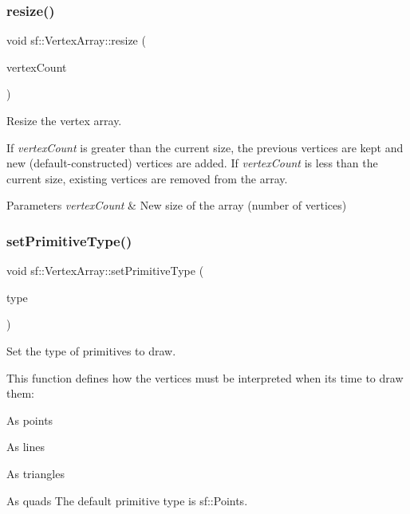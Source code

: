 \subsubsection{\texorpdfstring{resize()}{resize()}}
{\footnotesize\ttfamily void sf\+::\+Vertex\+Array\+::resize (\begin{DoxyParamCaption}\item[{std\+::size\+\_\+t}]{vertex\+Count }\end{DoxyParamCaption})}



Resize the vertex array. 

If {\itshape vertex\+Count} is greater than the current size, the previous vertices are kept and new (default-\/constructed) vertices are added. If {\itshape vertex\+Count} is less than the current size, existing vertices are removed from the array.


\begin{DoxyParams}{Parameters}
{\em vertex\+Count} & New size of the array (number of vertices) \\
\hline
\end{DoxyParams}
\mbox{\label{classsf_1_1_vertex_array_aa38c10707c28a97f4627ae8b2f3ad969}} 
\subsubsection{\texorpdfstring{set\+Primitive\+Type()}{setPrimitiveType()}}
{\footnotesize\ttfamily void sf\+::\+Vertex\+Array\+::set\+Primitive\+Type (\begin{DoxyParamCaption}\item[{\hyperlink{group__graphics_ga5ee56ac1339984909610713096283b1b}{Primitive\+Type}}]{type }\end{DoxyParamCaption})}



Set the type of primitives to draw. 

This function defines how the vertices must be interpreted when it\textquotesingle{}s time to draw them\+: \begin{DoxyItemize}
\item As points \item As lines \item As triangles \item As quads The default primitive type is sf\+::\+Points.\end{DoxyItemize}

